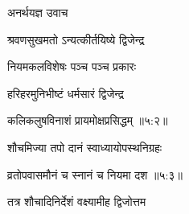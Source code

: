 \vers


{\devanagarifont अनर्थयज्ञ उवाच {\dandab}\dontdisplaylinenum  }%

\nemsloka 
{\devanagarifont श्रवणसुखमतो ऽन्यत्कीर्तयिष्ये द्विजेन्द्र }%
  \dontdisplaylinenum    {}%


\nemslokab

{\devanagarifont नियमकलविशेषः पञ्च पञ्च प्रकारः  \danda\dontdisplaylinenum }%

\nemslokac

{\devanagarifont हरिहरमुनिभीष्टं धर्मसारं द्विजेन्द्र }%
  \dontdisplaylinenum


\nemslokad

{\devanagarifont कलिकलुषविनाशं प्रायमोक्षप्रसिद्धम् {॥५:२॥} \veg\dontdisplaylinenum }%

\vers


{\devanagarifont शौचमिज्या तपो दानं स्वाध्यायोपस्थनिग्रहः \thinspace{\dandab} \dontdisplaylinenum }%


{\devanagarifont व्रतोपवासमौनं च स्नानं च नियमा दश {॥५:३॥} \veg\dontdisplaylinenum }%


{\devanagarifont तत्र शौचादिनिर्देशं वक्ष्यामीह द्विजोत्तम \thinspace{\dandab} \dontdisplaylinenum }%


